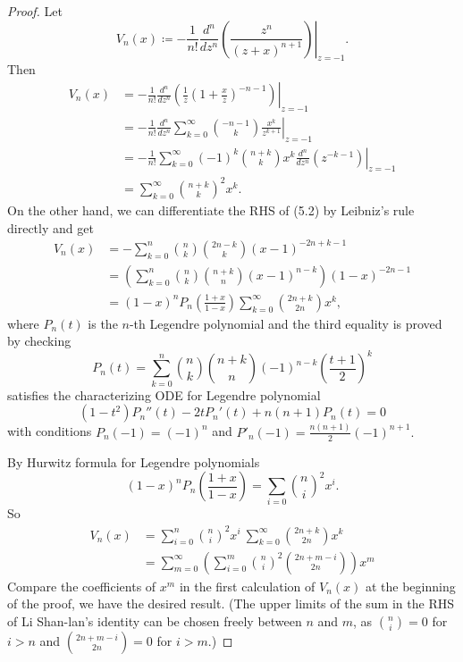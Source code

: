 \documentclass[12pt]{extarticle}
\theoremstyle{plain}
\theoremstyle{definition}
\theoremstyle{remark}
\begin{document}
\begin{proof}
    Let \begin{equation}
           V_n(x)\coloneqq\left.-\frac{1}{n!}\frac{d^n}{dz^{n}}\left(\frac{z^n}{(z+x)^{n+1}}\right)\right|_{z=-1}. 
    \end{equation}
    Then 
    \begin{align*}
        V_n(x)& =-\frac{1}{n!}\left.\frac{d^n}{dz^{n}}\left(\frac{1}{z}\left(1+\frac{x}{z}\right)^{-n-1}\right)\right|_{z=-1}\\
        &=-\frac{1}{n!}\left.\frac{d^n}{dz^{n}}\sum_{k=0}^\infty\binom{-n-1}{k}\frac{x^k}{z^{k+1}}\right|_{z=-1}\\
        &=-\frac{1}{n!}\sum_{k=0}^{\infty}(-1)^k\binom{n+k}{k}x^k\left.\frac{d^n}{dz^{n}}\left(z^{-k-1}\right)\right|_{z=-1}\\
        &=\sum_{k=0}^\infty\binom{n+k}{k}^2x^k.
    \end{align*}
    On the other hand, we can differentiate the RHS of (5.2) by Leibniz's rule directly and get
    \begin{align*}
        V_n(x)& =-\sum_{k=0}^n\binom{n}{k}\binom{2n-k}{k}(x-1)^{-2n+k-1}\\
        & =\left(\sum_{k=0}^n\binom{n}{k}\binom{n+k}{n}(x-1)^{n-k}\right)(1-x)^{-2n-1}\\
        & =(1-x)^n P_n\left(\frac{1+x}{1-x}\right)\sum_{k=0}^\infty\binom{2n+k}{2n}x^k,
    \end{align*}
where $P_n(t)$ is the $n$-th Legendre polynomial and the third equality is proved by checking $$P_n(t)=\sum_{k=0}^n\binom{n}{k}\binom{n+k}{n}(-1)^{n-k}\left(\frac{t+1}{2}\right)^k$$ satisfies the characterizing ODE for Legendre polynomial $$(1-t^2)P_n''(t)-2tP_n'(t)+n(n+1)P_n(t)=0$$ with conditions $P_n(-1)=(-1)^n$ and $P'_n(-1)=\frac{n(n+1)}{2}(-1)^{n+1}.$

By Hurwitz formula for Legendre polynomials
$$
    (1-x)^nP_n\left(\frac{1+x}{1-x}\right)=\sum_{i=0}\binom{n}{i}^2x^i.
$$
So 
\begin{align*}
    V_n(x)& =\sum_{i=0}^{n}\binom{n}{i}^2x^i\ \sum_{k=0}^\infty\binom{2n+k}{2n}x^k \\
    & = \sum_{m=0}^\infty\left(\sum_{i=0}^m\binom{n}{i}^2\binom{2n+m-i}{2n}\right)x^m
\end{align*}
Compare the coefficients of $x^m$ in the first calculation of $V_n(x)$ at the beginning of the proof, we have the desired result. (The upper limits of the sum in the RHS of Li Shan-lan's  identity can be chosen freely between $n$ and $m$, as $\binom{n}{i}=0$ for $i>n$ and $\binom{2n+m-i}{2n}=0$ for $i>m$.)
\end{proof}
\end{document}

